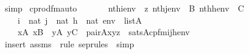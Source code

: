 \begin{isabellebody}
\ simp\isanewline
{}\isamarkupfalse%
%
\endisatagproof
{\isafoldproof}%
%
\isadelimproof
\isanewline
%
\endisadelimproof
\isanewline
{}\isamarkupfalse%
\ cprod{\isacharunderscore}{\kern0pt}fm{\isacharunderscore}{\kern0pt}auto{\isacharcolon}{\kern0pt}\isanewline
\ \ \isanewline
\ \ \ \ {\isachardoublequoteopen}nth{\isacharparenleft}{\kern0pt}i{\isacharcomma}{\kern0pt}env{\isacharparenright}{\kern0pt}\ {\isacharequal}{\kern0pt}\ z{\isachardoublequoteclose}\ {\isachardoublequoteopen}nth{\isacharparenleft}{\kern0pt}j{\isacharcomma}{\kern0pt}env{\isacharparenright}{\kern0pt}\ {\isacharequal}{\kern0pt}\ B{\isachardoublequoteclose}\ {\isachardoublequoteopen}nth{\isacharparenleft}{\kern0pt}h{\isacharcomma}{\kern0pt}env{\isacharparenright}{\kern0pt}\ {\isacharequal}{\kern0pt}\ C{\isachardoublequoteclose}\isanewline
\ \ \ \ {\isachardoublequoteopen}i\ {\isasymin}\ nat{\isachardoublequoteclose}\ {\isachardoublequoteopen}j\ {\isasymin}\ nat{\isachardoublequoteclose}\ {\isachardoublequoteopen}h\ {\isasymin}\ nat{\isachardoublequoteclose}\ {\isachardoublequoteopen}env\ {\isasymin}\ list{\isacharparenleft}{\kern0pt}A{\isacharparenright}{\kern0pt}{\isachardoublequoteclose}\isanewline
\ \ \isanewline
\ \ \ \ {\isachardoublequoteopen}{\isacharparenleft}{\kern0pt}{\isasymexists}x{\isasymin}A{\isachardot}{\kern0pt}\ x{\isasymin}B\ {\isasymand}\ {\isacharparenleft}{\kern0pt}{\isasymexists}y{\isasymin}A{\isachardot}{\kern0pt}\ y{\isasymin}C\ {\isasymand}\ pair{\isacharparenleft}{\kern0pt}{\isacharhash}{\kern0pt}{\isacharhash}{\kern0pt}A{\isacharcomma}{\kern0pt}x{\isacharcomma}{\kern0pt}y{\isacharcomma}{\kern0pt}z{\isacharparenright}{\kern0pt}{\isacharparenright}{\kern0pt}{\isacharparenright}{\kern0pt}\ {\isasymlongleftrightarrow}\ sats{\isacharparenleft}{\kern0pt}A{\isacharcomma}{\kern0pt}{\isacharquery}{\kern0pt}cpfm{\isacharparenleft}{\kern0pt}i{\isacharcomma}{\kern0pt}j{\isacharcomma}{\kern0pt}h{\isacharparenright}{\kern0pt}{\isacharcomma}{\kern0pt}env{\isacharparenright}{\kern0pt}{\isachardoublequoteclose}\isanewline
%
\isadelimproof
\ \ %
\endisadelimproof
%
\isatagproof
{}\isamarkupfalse%
\ {\isacharparenleft}{\kern0pt}insert\ assms\ {\isacharsemicolon}{\kern0pt}\ {\isacharparenleft}{\kern0pt}rule\ sep{\isacharunderscore}{\kern0pt}rules\ {\isacharbar}{\kern0pt}\ simp{\isacharparenright}{\kern0pt}{\isacharplus}{\kern0pt}{\isacharparenright}{\kern0pt}%
\endisatagproof
{\isafoldproof}%
%
\isadelimproof
\isanewline
%
\endisadelimproof
\isanewline
\isanewline

\end{isabellebody}
